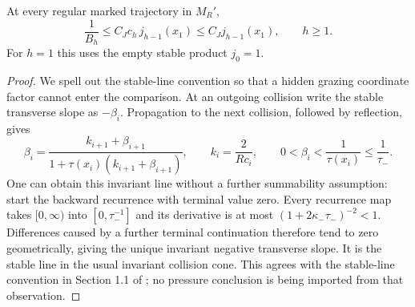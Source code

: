 \begin{lemma}
\label{lem:xf-stable}
At every regular marked trajectory in $M_R'$,
\begin{equation}\label{eq:xf-stable}
 \frac1{B_h}\le C_J c_h\,j_{h-1}(x_1)
                      \le C_Jj_{h-1}(x_1),\qquad h\ge1.
\end{equation}
For $h=1$ this uses the empty stable product $j_0=1$.
\end{lemma}
\begin{proof}
We spell out the stable-line convention so that a hidden grazing
coordinate factor cannot enter the comparison. At an outgoing
collision write the stable transverse slope as $-\beta_i$.
Propagation to the next collision, followed by reflection, gives
\begin{equation}\label{eq:xf-riccati}
 \beta_i=\frac{k_{i+1}+\beta_{i+1}}
                {1+\tau(x_i)(k_{i+1}+\beta_{i+1})},
 \qquad k_i=\frac{2}{Rc_i},
 \qquad 0<\beta_i<\frac1{\tau(x_i)}\le\frac1{\tau_-}.
\end{equation}
One can obtain this invariant line without a further summability
assumption: start the backward recurrence with terminal value zero.
Every recurrence map takes $[0,\infty)$ into $[0,\tau_-^{-1}]$
and its derivative is at most
$(1+2\kappa_-\tau_-)^{-2}<1$. Differences caused by a further
terminal continuation therefore tend to zero geometrically, giving
the unique invariant negative transverse slope. It is the stable
line in the usual invariant collision cone. This agrees with the
stable-line convention in Section 1.1 of \cite{BDPressure}; no
pressure conclusion is being imported from that observation.


\end{proof}
